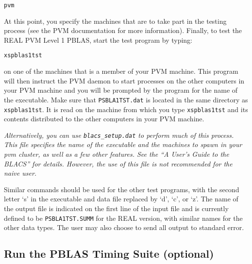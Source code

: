 \documentclass[11pt]{report}
\begin{document}
\begin{list}{}{}
\item{\tt pvm}
\end{list}

At this point, you specify the machines that are to take
part in the testing process (see the PVM documentation for more information).
Finally, to test the REAL PVM Level 1 PBLAS, start the test program
by typing:

\begin{list}{}{}
\item{\tt xspblas1tst}
\end{list}

on one of the machines that is a member of your PVM machine.
This program will then instruct the PVM daemon to start processes on the
other computers in your PVM machine and 
you will be prompted by the program for the name of the
executable.
Make sure that {\tt PSBLA1TST.dat} is located
in the same directory as {\tt xspblas1tst}.
It is read on the machine from which you type {\tt xspblas1tst} and
its contents distributed to the other computers in your PVM
machine.

{\it Alternatively, you can use {\tt blacs\_setup.dat} to perform much of
this process.  This file specifies the name of
the executable and the machines to spawn in your pvm cluster, as well
as a few other features.  See the ``A User's Guide to the BLACS'' for details.
However, the use of this file is not recommended for the naive user.}

Similar commands should be used for the other test programs, with
the second letter `s' in the executable and data file
replaced by `d', `c', or `z'.
The name of the output file is indicated on the first line of the
input file and is currently defined to be {\tt PSBLA1TST.SUMM} for
the REAL version, with similar names for the other data types.  The
user may also choose to send all output to standard error.

\subsection{Run the PBLAS Timing Suite (optional)}
\label{PBTIME}
\end{document}

